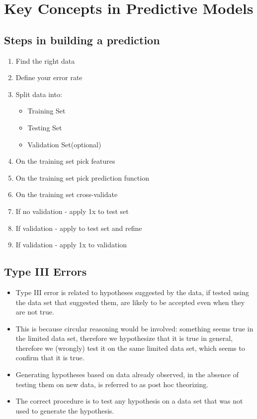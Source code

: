 \documentclass[caret-main.tex]{subfiles}
\begin{document}
\newpage
\section{Key Concepts in Predictive Models}

\subsection{Steps in building a prediction}
\begin{enumerate}
\item Find the right data
\item Define your error rate
\item Split data into:
\begin{itemize}
\item Training Set
\item Testing Set
\item Validation Set(optional)
\end{itemize}
\item On the training set pick features
\item On the training set pick prediction function
\item On the training set cross-validate

\item If no validation - apply 1x to test set
\item If validation - apply to test set and refine
\item If validation - apply 1x to validation
\end{enumerate}
\newpage
\subsection{Type III Errors}

\begin{itemize}
\item Type III error is related to hypotheses suggested by the data, if tested using the data set that suggested them, are likely to be accepted even when they are not true. 

\item This is because circular reasoning would be involved: something seems true in the limited data set, therefore we hypothesize that it is true in general, therefore we (wrongly) test it on the same limited data set, which seems to confirm that it is true. 

\item Generating hypotheses based on data already observed, in the absence of testing them on new data, is referred to as post hoc theorizing.


\item The correct procedure is to test any hypothesis on a data set that was not used to generate the hypothesis.
\end{itemize}
\newpage
\end{document}
